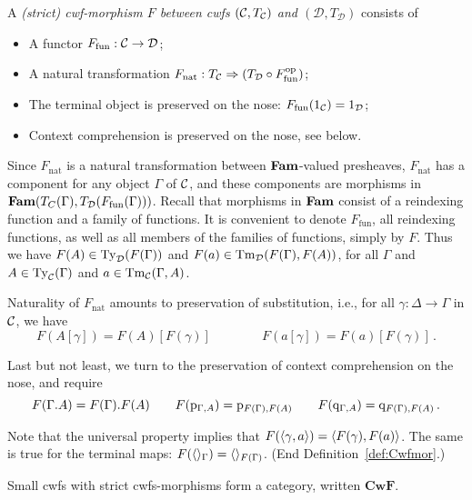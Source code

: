 \documentclass{mscs}
\def\D{\mathcal{D}}
\def\V{\mathrm{V}}
\def\Cwf{\mathbf{CwF}}
\def\nt{\mathrm{nat}}
\def\fun{\mathrm{fun}}
\begin{document}
\begin{definition}\label{def:Cwfmor}
A \emph{(strict) cwf-morphism $F$ between cwfs $({\mathcal C},T_{\mathcal C})$ and $(\D,T_\D)$}
consists of

\begin{itemize}

\item A functor $F_\fun : \C \to \D$;
\item A natural transformation $F_\nt : T_\C \Rightarrow (T_\D \circ F_\fun^\op)$;
\item The terminal object is preserved on the nose: $F_\fun(1_{\C}) = 1_{\D}$;
\item Context comprehension is preserved on the nose, see below.
\end{itemize}

Since $F_\nt$ is a natural transformation between $\textbf{Fam}$-valued presheaves,
$F_\nt$ has a component for any object $\Gamma$ of ${\mathcal C}$, and
these components are morphisms in $\Fam(T_C(\Gamma),T_\D(F_\fun(\Gamma)))$.
Recall that morphisms in $\textbf{Fam}$ consist of a reindexing function
and a family of functions. It is convenient to denote $F_\fun$,
all reindexing functions, as well as all members of the families of functions,
simply by $F$. Thus we have $F(A) \in \Ty_\D(F(\Gamma))$
and $F(a) \in \Tm_\D(F(\Gamma), F(A))$, for all $\Gamma$
and $A\in\mathrm{Ty}_{\mathcal C}(\Gamma)$ and $a\in \mathrm{Tm}_{\mathcal C}(\Gamma, A)$.

Naturality of $F_\nt$
amounts to preservation of substitution, {i.e.}, for all
$\gamma : \Delta \to \Gamma$ in ${\mathcal C}$, we have
\[
F(A[\gamma]) = F(A)[F(\gamma)] \qquad \qquad
F(a[\gamma]) = F(a)[F(\gamma)]\,.
\]

Last but not least, we turn to the preservation of context comprehension
on the nose, and require
\[
F(\Gamma. A) = F(\Gamma). F(A) \qquad
F(\mathrm{p}_{\Gamma, A}) = \mathrm{p}_{F(\Gamma), F(A)} \qquad
F(\mathrm{q}_{\Gamma, A}) = \mathrm{q}_{F(\Gamma), F(A)}\,.
\]

Note that the universal property implies that
$F(\langle \gamma,a \rangle) = \langle F(\gamma),F(a) \rangle$.
The same is true for the terminal maps:
$F(\langle  \rangle_\Gamma) = \langle  \rangle_{F(\Gamma)}$.
(End Definition~\ref{def:Cwfmor}.)
\end{definition}

Small cwfs with strict cwfs-morphisms form a category, written $\Cwf$.
\end{document}

